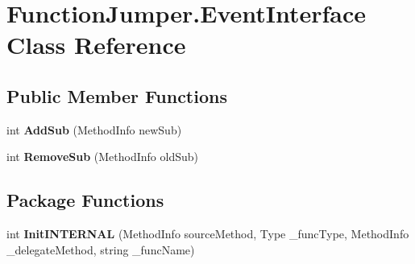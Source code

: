 \hypertarget{class_function_jumper_1_1_event_interface}{}\section{Function\+Jumper.\+Event\+Interface Class Reference}
\label{class_function_jumper_1_1_event_interface}
\subsection*{Public Member Functions}
\begin{DoxyCompactItemize}
\item 
int {\bfseries Add\+Sub} (Method\+Info new\+Sub)\hypertarget{class_function_jumper_1_1_event_interface_aa6c6be50833e2e22f67901b466c5398a}{}\label{class_function_jumper_1_1_event_interface_aa6c6be50833e2e22f67901b466c5398a}

\item 
int {\bfseries Remove\+Sub} (Method\+Info old\+Sub)\hypertarget{class_function_jumper_1_1_event_interface_a0ff2b04db56fc4c17d272105b097912f}{}\label{class_function_jumper_1_1_event_interface_a0ff2b04db56fc4c17d272105b097912f}

\end{DoxyCompactItemize}
\subsection*{Package Functions}
\begin{DoxyCompactItemize}
\item 
int {\bfseries Init\+I\+N\+T\+E\+R\+N\+AL} (Method\+Info source\+Method, Type \+\_\+func\+Type, Method\+Info \+\_\+delegate\+Method, string \+\_\+func\+Name)\hypertarget{class_function_jumper_1_1_event_interface_a244fed46b8a1caf01e214752f03d6213}{}\label{class_function_jumper_1_1_event_interface_a244fed46b8a1caf01e214752f03d6213}

\end{DoxyCompactItemize}
